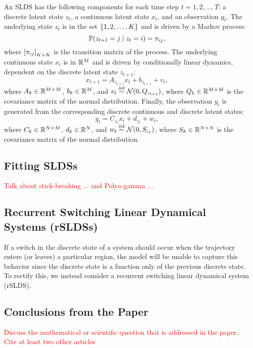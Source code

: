 An SLDS has the following components for each time step $t = 1,2, \dots, T$: a discrete latent state $z_t$, a continuous latent state $x_t$, and an observation $y_t$. The underlying state $z_t$ is in the set ${\left\{1,2,\dots,K\right\}}$ and is driven by a Markov process:
\[\mathbb{P}(z_{t+1} = j \mid z_t = i) = \pi_{ij}, \]
where ${\left[\pi_{ij}\right]}_{K\times K}$ is the transition matrix of the process. The underlying continuous state $x_t$ is in $\mathbb{R}^M$ and is driven by conditionally linear dynamics, dependent on the discrete latent state $z_{t+1}$:
\[x_{t+1} = A_{z_{t+1}} x_t + b_{z_{t+1}} + v_t, \]
where $A_k\in\mathbb{R}^{M\times M}$, $b_k\in \mathbb{R}^M$, and $v_t \overset{\mathrm{iid}}{\sim} \mathcal{N}(0,Q_{z_{t+1}})$, where $Q_k\in\mathbb{R}^{M\times M}$ is the covariance matrix of the normal distribution. Finally, the observation $y_t$ is generated from the corresponding discrete continuous and discrete latent states:
\[y_t = C_{z_{t}} x_t + d_{z_{t}} + w_t,\]
where $C_k\in\mathbb{R}^{N\times M}$, $d_k\in \mathbb{R}^N$, and $w_t \overset{\mathrm{iid}}{\sim} \mathcal{N}(0,S_{z_{t}})$, where $S_k\in\mathbb{R}^{N\times N}$ is the covariance matrix of the normal distribution.

\subsection{Fitting SLDSs}

\textcolor{red}{Talk about stick-breaking ... and Polya-gamma ...}

\subsection{Recurrent Switching Linear Dynamical Systems (rSLDSs)}

If a switch in the discrete state of a system should occur when the trajectory enters (or leaves) a particular region, the model will be unable to capture this behavior since the discrete state is a function only of the previous discrete state. To rectify this, we instead consider a recurrent switching linear dynamical system (rSLDS). 

\subsection{Conclusions from the Paper}



\textcolor{red}{Discuss the mathematical or scientific question that is addressed in the paper. Cite at least two other articles}
\begin{comment} 

 \end{comment}